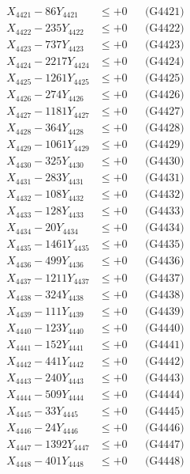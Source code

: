 \documentclass[a4paper,10pt]{article}
\begin{document}
{\begin{align}
\allowbreak
X_{4421} - 86Y_{4421} &\leq +0 && \text{(G4421)} \\
X_{4422} - 235Y_{4422} &\leq +0 && \text{(G4422)} \\
X_{4423} - 737Y_{4423} &\leq +0 && \text{(G4423)} \\
X_{4424} - 2217Y_{4424} &\leq +0 && \text{(G4424)} \\
X_{4425} - 1261Y_{4425} &\leq +0 && \text{(G4425)} \\
X_{4426} - 274Y_{4426} &\leq +0 && \text{(G4426)} \\
X_{4427} - 1181Y_{4427} &\leq +0 && \text{(G4427)} \\
X_{4428} - 364Y_{4428} &\leq +0 && \text{(G4428)} \\
X_{4429} - 1061Y_{4429} &\leq +0 && \text{(G4429)} \\
X_{4430} - 325Y_{4430} &\leq +0 && \text{(G4430)} \\
\allowbreak
X_{4431} - 283Y_{4431} &\leq +0 && \text{(G4431)} \\
X_{4432} - 108Y_{4432} &\leq +0 && \text{(G4432)} \\
X_{4433} - 128Y_{4433} &\leq +0 && \text{(G4433)} \\
X_{4434} - 20Y_{4434} &\leq +0 && \text{(G4434)} \\
X_{4435} - 1461Y_{4435} &\leq +0 && \text{(G4435)} \\
X_{4436} - 499Y_{4436} &\leq +0 && \text{(G4436)} \\
X_{4437} - 1211Y_{4437} &\leq +0 && \text{(G4437)} \\
X_{4438} - 324Y_{4438} &\leq +0 && \text{(G4438)} \\
X_{4439} - 111Y_{4439} &\leq +0 && \text{(G4439)} \\
X_{4440} - 123Y_{4440} &\leq +0 && \text{(G4440)} \\
\allowbreak
X_{4441} - 152Y_{4441} &\leq +0 && \text{(G4441)} \\
X_{4442} - 441Y_{4442} &\leq +0 && \text{(G4442)} \\
X_{4443} - 240Y_{4443} &\leq +0 && \text{(G4443)} \\
X_{4444} - 509Y_{4444} &\leq +0 && \text{(G4444)} \\
X_{4445} - 33Y_{4445} &\leq +0 && \text{(G4445)} \\
X_{4446} - 24Y_{4446} &\leq +0 && \text{(G4446)} \\
X_{4447} - 1392Y_{4447} &\leq +0 && \text{(G4447)} \\
X_{4448} - 401Y_{4448} &\leq +0 && \text{(G4448)} \\

\end{align}}
\end{document}
